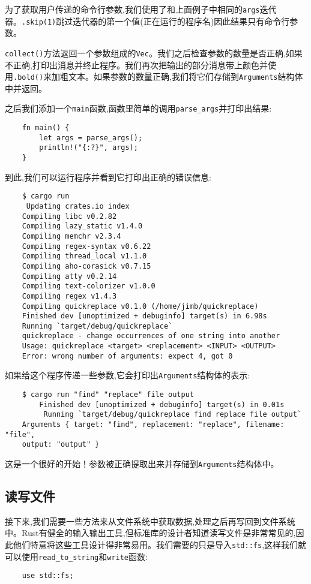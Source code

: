 为了获取用户传递的命令行参数,我们使用了和上面例子中相同的\texttt{args}迭代器。\texttt{.skip(1)}跳过迭代器的第一个值(正在运行的程序名)因此结果只有命令行参数。

\texttt{collect()}方法返回一个参数组成的\texttt{Vec}。我们之后检查参数的数量是否正确,如果不正确,打印出消息并终止程序。我们再次把输出的部分消息带上颜色并使用\texttt{.bold()}来加粗文本。如果参数的数量正确,我们将它们存储到\texttt{Arguments}结构体中并返回。

之后我们添加一个\texttt{main}函数,函数里简单的调用\texttt{parse\_args}并打印出结果:
\begin{verbatim}
    fn main() {
        let args = parse_args();
        println!("{:?}", args);
    }
\end{verbatim}

到此,我们可以运行程序并看到它打印出正确的错误信息:
\begin{verbatim}
    $ cargo run
     Updating crates.io index
    Compiling libc v0.2.82
    Compiling lazy_static v1.4.0
    Compiling memchr v2.3.4
    Compiling regex-syntax v0.6.22
    Compiling thread_local v1.1.0
    Compiling aho-corasick v0.7.15
    Compiling atty v0.2.14
    Compiling text-colorizer v1.0.0
    Compiling regex v1.4.3
    Compiling quickreplace v0.1.0 (/home/jimb/quickreplace)
    Finished dev [unoptimized + debuginfo] target(s) in 6.98s
    Running `target/debug/quickreplace`
    quickreplace - change occurrences of one string into another
    Usage: quickreplace <target> <replacement> <INPUT> <OUTPUT>
    Error: wrong number of arguments: expect 4, got 0
\end{verbatim}

如果给这个程序传递一些参数,它会打印出\texttt{Arguments}结构体的表示:
\begin{verbatim}
    $ cargo run "find" "replace" file output
        Finished dev [unoptimized + debuginfo] target(s) in 0.01s
         Running `target/debug/quickreplace find replace file output`
    Arguments { target: "find", replacement: "replace", filename: "file",
    output: "output" }
\end{verbatim}

这是一个很好的开始！参数被正确提取出来并存储到\texttt{Arguments}结构体中。

\subsection{读写文件}
接下来,我们需要一些方法来从文件系统中获取数据,处理之后再写回到文件系统中。Rust有健全的输入输出工具,但标准库的设计者知道读写文件是非常常见的,因此他们特意将这些工具设计得非常易用。我们需要的只是导入\texttt{std::fs},这样我们就可以使用\texttt{read\_to\_string}和\texttt{write}函数:
\begin{verbatim}
    use std::fs;
\end{verbatim}

